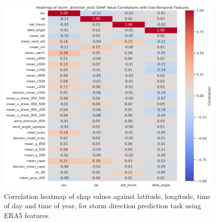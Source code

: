 \begin{figure}[ht]
    \centering
    \includegraphics[width=\textwidth]{../figures/generated/experiments/storm_direction/storm_direction_era5_shap_correlation_heatmap.png}
    \caption{Correlation heatmap of \acrshort{shap} values against latitude, longitude, time of day and time of year, for storm direction prediction task using ERA5 features.}
    \label{fig:storm_direction_era5_shap_heatmap}
\end{figure}

